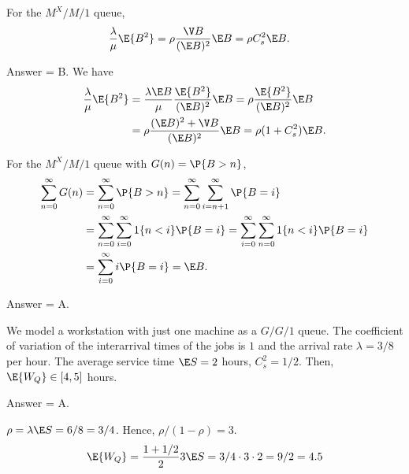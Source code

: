 \begin{exercise}[201704]%
For the $M^X/M/1$ queue, 
\begin{equation*}
 \begin{split}
 \frac{\lambda}\mu \E{B^2} 
&= \rho \frac{\V B}{(\E B)^2}\E B = \rho C_s^2\E B.
 \end{split}
\end{equation*}
\begin{solution} Answer = B.
We have
\begin{equation*}
 \begin{split}
 \frac{\lambda}\mu \E{B^2} 
&= \frac{\lambda\E B}{\mu} \frac{\E{B^2}}{(\E B)^2} \E B = \rho \frac{\E{B^2}}{(\E B)^2} \E B \\
&= \rho \frac{(\E B)^2+\V B}{(\E B)^2}\E B = \rho (1+C_s^2)\E B.
 \end{split}
\end{equation*}
\end{solution}
\end{exercise}

\begin{exercise}[201704]%
 For the $M^X/M/1$ queue with $G(n) = \P{B> n}$, 
\begin{align*}
\sum_{n=0}^\infty G(n) 
&= \sum_{n=0}^\infty \P{B>n} 
= \sum_{n=0}^\infty \sum_{i=n+1}^\infty \P{B=i} \\
& = \sum_{n=0}^\infty \sum_{i=0}^\infty 1\{n<i\} \P{B=i} 
= \sum_{i=0}^\infty \sum_{n=0}^\infty 1 \{n<i\} \P{B=i} \\
&= \sum_{i=0}^\infty i \P{B=i} = \E B.
\end{align*}
\begin{solution} Answer = A.
\end{solution}
\end{exercise}

\begin{exercise}[201704]%
 We model a workstation with just one machine as a $G/G/1$ queue. The coefficient of variation of the interarrival times of the jobs is $1$ and the arrival rate $\lambda=3/8$ per hour. The
 average service time $\E S = 2$ hours, $C^2_s = 1/2$. Then, $\E{W_Q} \in [4, 5]$ hours. 
\begin{solution} Answer = A.

$\rho=\lambda \E S = 6/8 = 3/4$. Hence, $\rho/(1-\rho)=3$.
 \begin{equation*}
 \E{W_Q}= \frac{1+1/2}2 3 \E S = 3/4 \cdot 3 \cdot 2 = 9/2 = 4.5
 \end{equation*}
\end{solution}

\end{exercise}


